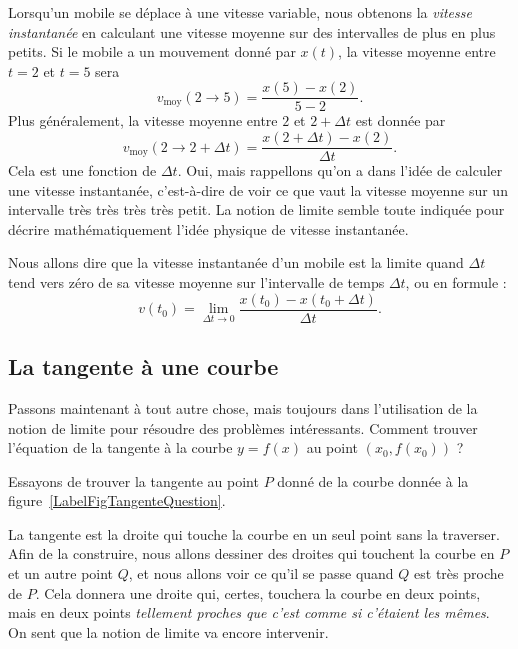 Lorsqu'un mobile se déplace à une vitesse variable, nous obtenons la \emph{vitesse instantanée} en calculant une vitesse moyenne sur des intervalles de plus en plus petits. Si le mobile a un mouvement donné par \( x(t)\), la vitesse moyenne entre \( t=2\) et \( t=5\) sera
\[
	v_{\text{moy}}(2\to 5)=\frac{ x(5)-x(2) }{ 5-2 }.
\]
Plus généralement, la vitesse moyenne entre \( 2\) et \( 2+\Delta t\) est donnée par
\[
	v_{\text{moy}}(2\to 2+\Delta t)=\frac{ x(2+\Delta t)-x(2) }{ \Delta t }.
\]
Cela est une fonction de \( \Delta t\). Oui, mais rappellons qu'on a dans l'idée de calculer une vitesse instantanée, c'est-à-dire de voir ce que vaut la vitesse moyenne sur un intervalle très {\small très} {\footnotesize très} {\scriptsize très} {\tiny petit}. La notion de limite semble toute indiquée pour décrire mathématiquement l'idée physique de vitesse instantanée.

Nous allons dire que la vitesse instantanée d'un mobile est la limite quand \( \Delta t\) tend vers zéro de sa vitesse moyenne sur l'intervalle de temps \( \Delta t\), ou en formule :
\begin{equation}		\label{Eqvinstlimite}
	v(t_0)=\lim_{\Delta t\to 0}\frac{ x(t_0)-x(t_0+\Delta t) }{ \Delta t }.
\end{equation}

\subsection{La tangente à une courbe}

Passons maintenant à tout autre chose, mais toujours dans l'utilisation de la notion de limite pour résoudre des problèmes intéressants. Comment trouver l'équation de la tangente à la courbe \( y=f(x)\) au point \( (x_0,f(x_0))\) ?

Essayons de trouver la tangente au point \( P\) donné de la courbe donnée à la figure~\ref{LabelFigTangenteQuestion}.

\newcommand{\CaptionFigTangenteQuestion}{Comment trouver la tangente à la courbe au point \( P\) ?}


La tangente est la droite qui touche la courbe en un seul point sans la traverser. Afin de la construire, nous allons dessiner des droites qui touchent la courbe en \( P\) et un autre point \( Q\), et nous allons voir ce qu'il se passe quand \( Q\) est très proche de \( P\). Cela donnera une droite qui, certes, touchera la courbe en deux points, mais en deux points \emph{tellement proches que c'est comme si c'étaient les mêmes}. On sent que la notion de limite va encore intervenir.

